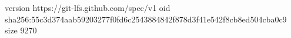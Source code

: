 version https://git-lfs.github.com/spec/v1
oid sha256:55c3d374aab59203277f0fd6c2543884842f878d3f41e542f8cb8ed504cba0c9
size 9270
